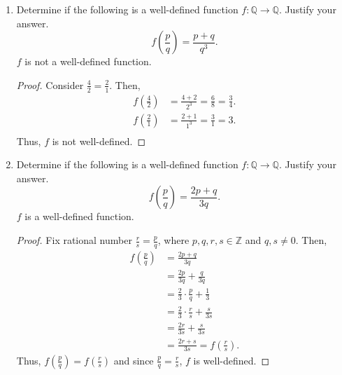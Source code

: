 \documentclass{article}
\begin{document}
\begin{enumerate}
	\item Determine if the following is a well-defined function $f : \mathbb{Q} \rightarrow \mathbb{Q}$.  Justify your answer.
		\[
			f \left( \frac{p}{q} \right) = \frac{ p + q }{ q^3 }.
		\]
            $f$ is not a well-defined function.
            \begin{proof}
                Consider $\frac{4}{2} = \frac{2}{1}$. Then, 
                \begin{align*}
                    f \left( \frac{4}{2} \right) &= \frac{4 + 2}{2^3} = \frac{6}{8} = \frac{3}{4}.\\ 
                    f \left( \frac{2}{1} \right) &= \frac{2 + 1}{1^3} = \frac{3}{1} = 3.\\ 
                \end{align*}
                Thus, $f$ is not well-defined.
            \end{proof}

	\item Determine if the following is a well-defined function $f : \mathbb{Q} \rightarrow \mathbb{Q}$.  Justify your answer.
		\[
			f \left( \frac{p}{q} \right) = \frac{ 2p + q }{ 3q }.
		\]
            $f$ is a well-defined function.
            \begin{proof}
                Fix rational number $\frac{r}{s} = \frac{p}{q}$, where $p, q, r, s \in\mathbb{Z}$ and $q, s \ne 0$. Then, 
                \begin{align*}
                    f \left( \frac{p}{q} \right) &= \frac{ 2p + q }{ 3q } \\
                    &= \frac{2p}{3q} + \frac{q}{3q} \\
                    &= \frac{2}{3} \cdot \frac{p}{q} + \frac{1}{3} \\
                    &= \frac{2}{3} \cdot \frac{r}{s} + \frac{s}{3s} \\
                    &= \frac{2r}{3s} + \frac{s}{3s} \\
                    &= \frac{2r + s}{3s} =  f \left( \frac{r}{s} \right).
                \end{align*}
                Thus, $f (\frac{p}{q}) = f(\frac{r}{s})$ and since $\frac{p}{q} = \frac{r}{s}$, $f$ is well-defined.
            \end{proof}
        

\end{enumerate}
\end{document}
